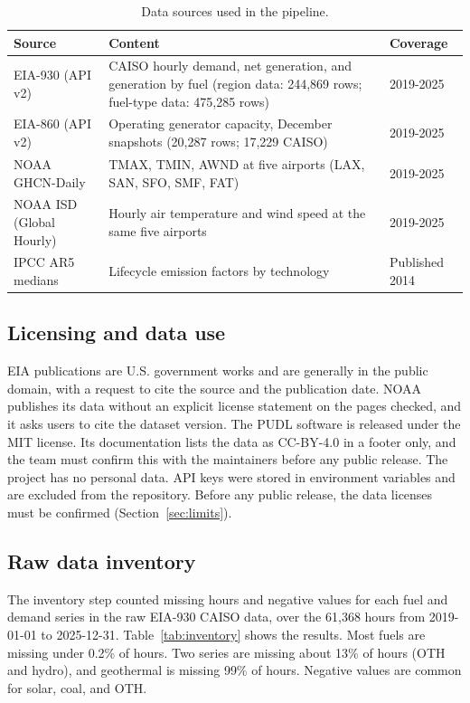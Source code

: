 \documentclass[10pt,journal,compsoc]{IEEEtran}
\begin{document}
\begin{table}[t]
\caption{Data sources used in the pipeline.}
\label{tab:sources}
\centering
\small
\begin{tabular}{@{}p{3.0cm}p{9.0cm}p{3.0cm}@{}}
\toprule
Source & Content & Coverage \\
\midrule
EIA-930 (API v2) & CAISO hourly demand, net generation, and generation by fuel (region data: 244,869 rows; fuel-type data: 475,285 rows) & 2019-2025 \\
EIA-860 (API v2) & Operating generator capacity, December snapshots (20,287 rows; 17,229 CAISO) & 2019-2025 \\
NOAA GHCN-Daily & TMAX, TMIN, AWND at five airports (LAX, SAN, SFO, SMF, FAT) & 2019-2025 \\
NOAA ISD (Global Hourly) & Hourly air temperature and wind speed at the same five airports & 2019-2025 \\
IPCC AR5 medians & Lifecycle emission factors by technology & Published 2014 \\
\bottomrule
\end{tabular}
\end{table}

\subsection{Licensing and data use}
EIA publications are U.S. government works and are generally in the public domain, with a request to cite the source and the publication date. NOAA publishes its data without an explicit license statement on the pages checked, and it asks users to cite the dataset version. The PUDL software is released under the MIT license. Its documentation lists the data as CC-BY-4.0 in a footer only, and the team must confirm this with the maintainers before any public release. The project has no personal data. API keys were stored in environment variables and are excluded from the repository. Before any public release, the data licenses must be confirmed (Section~\ref{sec:limits}).

\subsection{Raw data inventory}
The inventory step counted missing hours and negative values for each fuel and demand series in the raw EIA-930 CAISO data, over the 61,368 hours from 2019-01-01 to 2025-12-31. Table~\ref{tab:inventory} shows the results. Most fuels are missing under 0.2\% of hours. Two series are missing about 13\% of hours (OTH and hydro), and geothermal is missing 99\% of hours. Negative values are common for solar, coal, and OTH.
\end{document}
